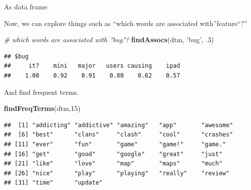 \documentclass[]{book}
\newenvironment{Shaded}{\begin{snugshade}}{\end{snugshade}}
\newcommand{\KeywordTok}[1]{\textcolor[rgb]{0.13,0.29,0.53}{\textbf{{#1}}}}
\newcommand{\DecValTok}[1]{\textcolor[rgb]{0.00,0.00,0.81}{{#1}}}
\newcommand{\StringTok}[1]{\textcolor[rgb]{0.31,0.60,0.02}{{#1}}}
\newcommand{\CommentTok}[1]{\textcolor[rgb]{0.56,0.35,0.01}{\textit{{#1}}}}
\newcommand{\NormalTok}[1]{{#1}}
\begin{document}
As data frame:

\begin{Shaded}
\end{Shaded}

Now, we can explore things such as ``which words are associated
with''feature``?''

\begin{Shaded}
\begin{Highlighting}[]
\CommentTok{# which words are associated with "bug"?}
\KeywordTok{findAssocs}\NormalTok{(dtm, }\StringTok{'bug'}\NormalTok{, .}\DecValTok{3}\NormalTok{)}
\end{Highlighting}
\end{Shaded}

\begin{verbatim}
## $bug
##     it?    mini   major   users causing    ipad 
##    1.00    0.92    0.91    0.80    0.62    0.57
\end{verbatim}

And find frequent terms.

\begin{Shaded}
\begin{Highlighting}[]
\KeywordTok{findFreqTerms}\NormalTok{(dtm,}\DecValTok{15}\NormalTok{)}
\end{Highlighting}
\end{Shaded}

\begin{verbatim}
##  [1] "addicting" "addictive" "amazing"   "app"       "awesome"  
##  [6] "best"      "clans"     "clash"     "cool"      "crashes"  
## [11] "ever"      "fun"       "game"      "game!"     "game."    
## [16] "get"       "good"      "google"    "great"     "just"     
## [21] "like"      "love"      "map"       "maps"      "much"     
## [26] "nice"      "play"      "playing"   "really"    "review"   
## [31] "time"      "update"
\end{verbatim}
\end{document}
